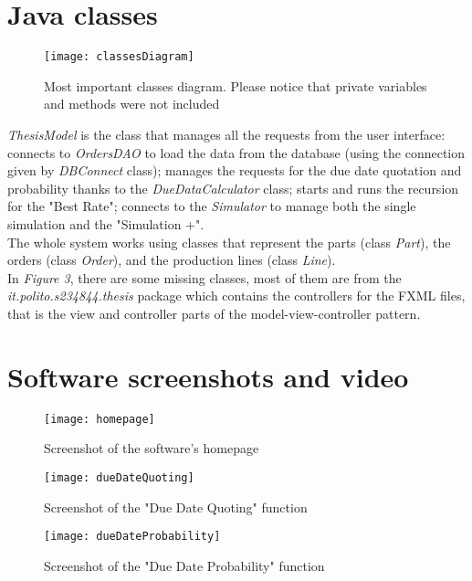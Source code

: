\documentclass[a4paper,12pt]{article}
\begin{document}
\section{Java classes}
\begin{figure}[H]
	\centering
   	 \texttt{[image: classesDiagram]}
	\caption{Most important classes diagram. Please notice that private variables and methods were not included}
\end{figure}
\textit{ThesisModel} is the class that manages all the requests from the user interface: connects to \textit{OrdersDAO} to load the data from the database (using the connection given by \textit{DBConnect} class); manages the requests for the due date quotation and probability thanks to the \textit{DueDataCalculator} class; starts and runs the recursion for the "Best Rate"; connects to the \textit{Simulator} to manage both the single simulation and the "Simulation +".\\
The whole system works using classes that represent the parts (class \textit{Part}), the orders (class \textit{Order}), and the production lines (class \textit{Line}).\\
In \textit{Figure 3}, there are some missing classes, most of them are from the \textit{it.polito.s234844.thesis} package which contains the controllers for the FXML files, that is the view and controller parts of the model-view-controller pattern. 

\newpage
\section{Software screenshots and video}
\begin{figure}[H]
	\centering
   	 \texttt{[image: homepage]}
	\caption{Screenshot of the software's homepage}
\end{figure}

\begin{figure}[H]
	\centering
   	 \texttt{[image: dueDateQuoting]}
	\caption{Screenshot of the "Due Date Quoting" function}
\end{figure}

\begin{figure}[H]
	\centering
   	 \texttt{[image: dueDateProbability]}
	\caption{Screenshot of the "Due Date Probability" function}
\end{figure}
\end{document}
